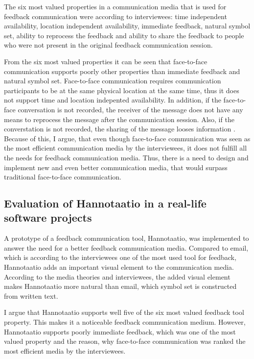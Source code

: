\documentclass[english,12pt,a4paper,pdftex]{article}
\begin{document}
The six most valued properties in a communication media that is used for feedback communication were according to interviewees: time independent availability, location independent availability, immediate feedback, natural symbol set, ability to reprocess the feedback and ability to share the feedback to people who were not present in the original feedback communication session.

From the six most valued properties it can be seen that face-to-face communication supports poorly other properties than immediate feedback and natural symbol set. Face-to-face communication requires communication participants to be at the same physical location at the same time, thus it does not support time and location indepented availability. In addition, if the face-to-face conversation is not recorded, the receiver of the message does not have any means to reprocess the message after the communication session. Also, if the converstation is not recorded, the sharing of the message looses information \citep{higa2007}. Because of this, I argue, that even though face-to-face communication was seen as the most efficient communication media by the interviewees, it does not fulfill all the needs for feedback communication media. Thus, there is a need to design and implement new and even better communication media, that would surpass traditional face-to-face communication.

\subsection{Evaluation of Hannotaatio in a real-life software projects}

A prototype of a feedback communication tool, Hannotaatio, was implemented to answer the need for a better feedback communication media. Compared to email, which is according to the interviewees one of the most used tool for feedback, Hannotaatio adds an important visual element to the communication media. According to the media theories and interviewees, the added visual element makes Hannotaatio more natural than email, which symbol set is constructed from written text.

I argue that Hannotaatio supports well five of the six most valued feedback tool property. This makes it a noticeable feedback communication medium. However, Hannotaatio supports poorly immediate feedback, which was one of the most valued property and the reason, why face-to-face communication was ranked the most efficient media by the interviewees.
\end{document}
